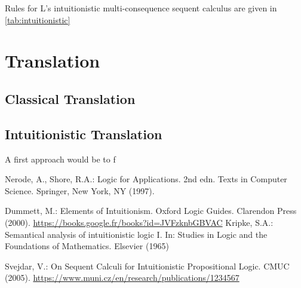 \documentclass[runningheads]{llncs}
\begin{document}
\developmentSequentIntuitionisticDefinition

Rules for L's intuitionistic multi-consequence sequent calculus are given in \ref{tab:intuitionistic}


\RulesIntuitionisticSequentCalculus


\section{Translation}

\nodeTranslationFunction

\uselessTheorem

\subsection{Classical Translation}



\localTranslationValidityTheorem
    


\TranslationClassical

\TranslationClassicalProof



\subsection{Intuitionistic Translation}

A first approach would be to f


%
%
%
% 
% 
%
\begin{thebibliography}{8}

    Nerode, A., Shore, R.A.: Logic for Applications. 2nd edn. Texts in Computer Science. Springer, New York, NY (1997). 
    
    Dummett, M.: Elements of Intuitionism. Oxford Logic Guides. Clarendon Press (2000). \url{https://books.google.fr/books?id=JVFzknbGBVAC}
    Kripke, S.A.: Semantical analysis of intuitionistic logic I. In: Studies in Logic and the Foundations of Mathematics. Elsevier (1965)


    Svejdar, V.: On Sequent Calculi for Intuitionistic Propositional Logic. CMUC (2005). \url{https://www.muni.cz/en/research/publications/1234567}


\end{thebibliography}
\end{document}
